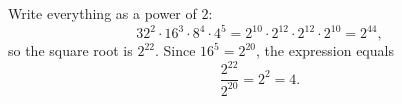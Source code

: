 Write everything as a power of $2$:
\[
32^2\cdot16^3\cdot8^4\cdot4^5=2^{10}\cdot2^{12}\cdot2^{12}\cdot2^{10}=2^{44},
\]
so the square root is $2^{22}$. Since $16^5=2^{20}$, the expression equals
\[
\dfrac{2^{22}}{2^{20}}=2^2=\boxed{4}.
\]

